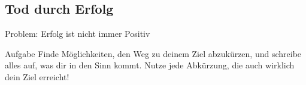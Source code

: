 \subsection{Tod durch Erfolg}


\begin{frame}[c]{Problem: Erfolg ist nicht immer Positiv}
\end{frame}


\begin{frame}[c]
    \begin{block}{Aufgabe}
        Finde Möglichkeiten, den Weg zu deinem Ziel abzukürzen, und schreibe
        alles auf, was dir in den Sinn kommt. Nutze jede Abkürzung, die auch
        wirklich dein Ziel erreicht!
    \end{block}
\end{frame}



%
%
%
%
%
%




